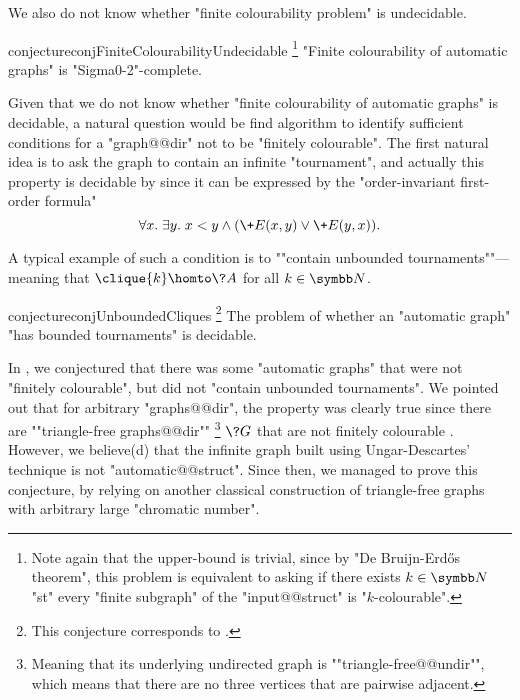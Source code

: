 We also do not know whether "finite colourability problem" is undecidable.
\begin{restatable}{conjecture}{conjFiniteColourabilityUndecidable}
	\!\footnote{Note again that the upper-bound is trivial, since by "De Bruijn-Erdős theorem",
	this problem is equivalent to asking if there exists $k\in \N$ "st"
	every "finite subgraph" of the "input@@struct" is "$k$-colourable".}
	\AP\label{conj:finite-colourability-undecidable}
	"Finite colourability of automatic graphs" is "Sigma0-2"-complete.
\end{restatable}

Given that we do not know whether "finite colourability of automatic graphs"
is decidable, a natural question would be find algorithm to identify sufficient conditions
for a "graph@@dir" not to be "finitely colourable".
The first natural idea is to ask the graph to contain an infinite "tournament",
and actually this property is decidable by 
since it can be expressed by the "order-invariant first-order formula"
\[\forall x.\;\exists y.\; x < y \land (\+E(x,y) \lor \+E(y,x)).\]

A typical example of such a condition
is to \AP""contain unbounded tournaments""---meaning that $\clique{k} \homto \?A$ for all $k\in\N$.

\begin{restatable}{conjecture}{conjUnboundedCliques}
	\!\footnote{This conjecture corresponds to \cite[Conjecture 7.3]{BarceloFigueiraMorvan2023SeparatingAutomatic}.}
	\AP\label{conj:unbounded-cliques}
    The problem of whether an "automatic graph" "has bounded tournaments" is decidable.
\end{restatable}

In \cite[Conjecture 7.2]{BarceloFigueiraMorvan2023SeparatingAutomatic}, we conjectured
that there was some "automatic graphs" that were not "finitely colourable",
but did not "contain unbounded tournaments".
We pointed out that for arbitrary "graphs@@dir", the property was clearly true 
since there are \AP""triangle-free graphs@@dir""%
\footnote{Meaning that its underlying undirected graph is \AP""triangle-free@@undir"",
which means that there are no three vertices that are pairwise adjacent.}
$\?G$ that are not finitely colourable \cite{UngarDescartes1954ChromaticGraphs}.
However, we believe(d) that the infinite graph built using Ungar-Descartes' technique
is not "automatic@@struct".
Since then, we managed to prove this conjecture, by relying on another classical construction of
triangle-free graphs with arbitrary large "chromatic number".

